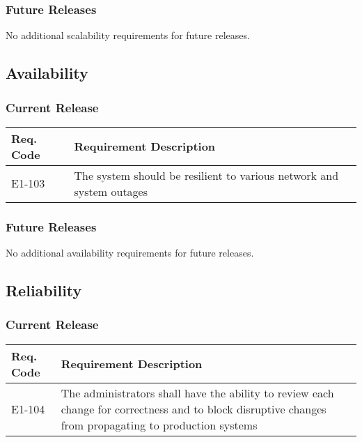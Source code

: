\documentclass[12pt]{article}
\begin{document}
\subsubsection{Future Releases}
No additional scalability requirements for future releases.


\subsection{Availability}

\subsubsection{Current Release}

\begin{center}
	\begin{tabular}{| p{2.5cm} | p{12.5cm} |}
		\hline
		\textbf{Req. Code} & \textbf{Requirement Description}\\
		\hline
		E1-103	& The system should be resilient to various network and system outages\\
		\hline
	\end{tabular}
	\label{tab:AvailabilityRequirements}
\end{center}

\subsubsection{Future Releases}
No additional availability requirements for future releases.


\subsection{Reliability}

\subsubsection{Current Release}

\begin{center}
	\begin{tabular}{| p{2.5cm} | p{12.5cm} |}
		\hline
		\textbf{Req. Code} & \textbf{Requirement Description}\\
		\hline
		E1-104	& The administrators shall have the ability to review each change for correctness
        and to block disruptive changes from propagating to production systems\\
		\hline
	\end{tabular}
	\label{tab:ReliabilityRequirements}
\end{center}
\end{document}
